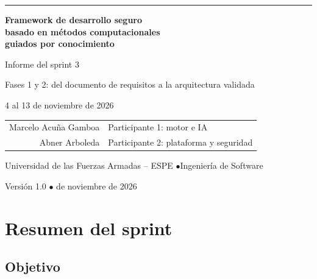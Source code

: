 \documentclass[11pt,a4paper]{report}
\begin{document}
\begin{titlepage}
\centering
\vspace*{4.2cm}
{\color{azulfw}\rule{\textwidth}{0.8pt}}\par\vspace{0.9cm}
{\fontsize{24}{30}\selectfont\bfseries Framework de desarrollo seguro\\
basado en métodos computacionales\\ guiados por conocimiento\par}
\vspace{0.9cm}{\color{azulfw}\rule{\textwidth}{0.8pt}}\par
\vspace{1.1cm}
{\Large Informe del sprint 3\par}
\vspace{0.3cm}
{\large Fases 1 y 2: del documento de requisitos a la arquitectura validada\par}
\vspace{0.3cm}
{\normalsize 4 al 13 de noviembre de 2026\par}
\vspace{2.2cm}
{\normalsize
\begin{tabular}{rl}
Marcelo Acuña Gamboa & Participante 1: motor e IA\\
Abner Arboleda & Participante 2: plataforma y seguridad\\
\end{tabular}\par}
\vfill
{\normalsize Universidad de las Fuerzas Armadas – ESPE \quad$\bullet$\quad Ingeniería de Software\par}
\vspace{0.4cm}
{\normalsize Versión 1.0 \quad$\bullet$ de noviembre de 2026\par}
\end{titlepage}

\tableofcontents

\chapter{Resumen del sprint}

\section{Objetivo}
\end{document}
